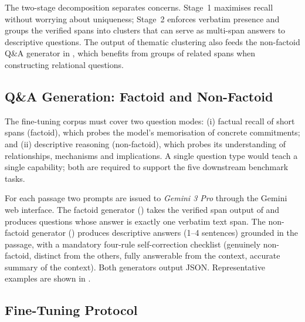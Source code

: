 \documentclass[pdflatex, sn-apa]{sn-jnl}%
\theoremstyle{thmstyleone}%
\theoremstyle{thmstyletwo}%
\theoremstyle{thmstylethree}%
\begin{document}

The two-stage decomposition separates concerns. Stage~1 maximises recall without
worrying about uniqueness; Stage~2 enforces verbatim presence and groups the
verified spans into clusters that can serve as multi-span answers to descriptive
questions. The output of thematic clustering also feeds the non-factoid Q\&A
generator in , which benefits from groups of related spans
when constructing relational questions.

\subsection{Q\&A Generation: Factoid and Non-Factoid}
\label{sec:method:qa}

The fine-tuning corpus must cover two question modes: (i) factual recall of short
spans (factoid), which probes the model's memorisation of concrete commitments;
and (ii) descriptive reasoning (non-factoid), which probes its understanding of
relationships, mechanisms and implications. A single question type would teach a
single capability; both are required to support the five downstream benchmark
tasks.

For each passage two prompts are issued to \textit{Gemini 3 Pro} through the
Gemini web interface. The factoid generator
() takes the verified span output of
 and produces questions whose answer is exactly one
verbatim text span. The non-factoid generator
() produces descriptive answers (1--4
sentences) grounded in the passage, with a mandatory four-rule self-correction
checklist (genuinely non-factoid, distinct from the others, fully answerable from
the context, accurate summary of the context). Both generators output JSON.
Representative examples are shown in .




\subsection{Fine-Tuning Protocol}
\label{sec:method:finetune}
\end{document}
